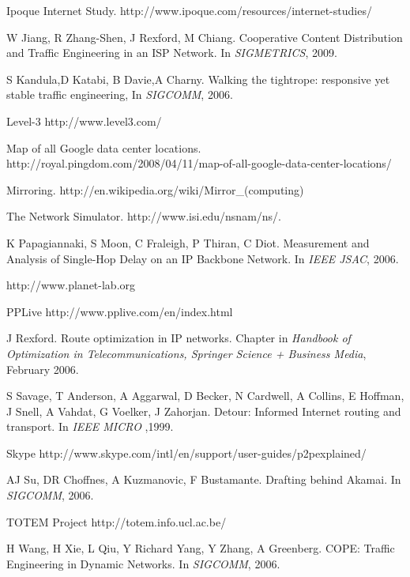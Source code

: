 \begin{thebibliography}{99}
	Ipoque Internet Study.
	http://www.ipoque.com/resources/internet-studies/



	W Jiang, R Zhang-Shen, J Rexford, M Chiang.
	 Cooperative Content Distribution and Traffic Engineering in an ISP Network.
	 In \emph{SIGMETRICS},
	 2009.


	S Kandula,D Katabi, B Davie,A Charny.
	Walking the tightrope: responsive yet stable traffic engineering,
	 In \emph{SIGCOMM},
	 2006.

	Level-3 http://www.level3.com/

	Map of all Google data center locations.
	http://royal.pingdom.com/2008/04/11/map-of-all-google-data-center-locations/


	Mirroring. http://en.wikipedia.org/wiki/Mirror\_(computing)

	The Network Simulator. http://www.isi.edu/nsnam/ns/.



	K Papagiannaki, S Moon, C Fraleigh, P Thiran, C Diot.
	Measurement and Analysis of Single-Hop Delay on an IP Backbone Network.
	In \emph{IEEE JSAC}, 2006.


	http://www.planet-lab.org

	PPLive http://www.pplive.com/en/index.html

	J Rexford.
	Route optimization in IP networks.
	Chapter in \emph{Handbook of Optimization in Telecommunications, Springer Science + Business Media},
	February 2006.

	S Savage, T Anderson, A Aggarwal, D Becker, N Cardwell, A Collins, E Hoffman, J Snell, A Vahdat, G Voelker, J Zahorjan.
	Detour: Informed Internet routing and transport.
	In \emph{IEEE MICRO} ,1999.

	Skype http://www.skype.com/intl/en/support/user-guides/p2pexplained/




  	AJ Su, DR Choffnes, A Kuzmanovic, F Bustamante.
	Drafting behind Akamai.
	In \emph{SIGCOMM}, 2006.



	TOTEM Project
	http://totem.info.ucl.ac.be/
	

	 H Wang, H Xie, L Qiu, Y Richard Yang, Y Zhang, A Greenberg.
	  COPE: Traffic Engineering in Dynamic Networks.
	  In \emph{SIGCOMM},
	  2006.


\end{thebibliography}
